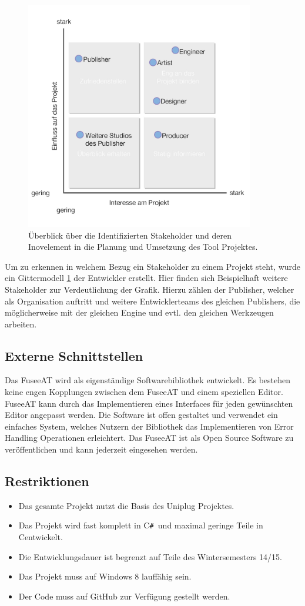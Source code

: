 \documentclass[pagesize, paper=a4, fontsize=12pt, titlepage=true, headings=small, headnosepline, abstractoff, liststotoc, nochapterprefix, plainheadsepline, twoside]{scrreprt}
\newcommand{\CSS}{C\texttt{\# }}
\newcommand{\CPP}{C\nolinebreak\hspace{-.05em}\raisebox{.4ex}{\tiny\bf +}\nolinebreak\hspace{-.10em}\raisebox{.4ex}{\tiny\bf +}}
\begin{document}
\begin{figure}[ht]
	\centering
	\includegraphics[width=10cm]{Bilder/Stakeholder_Diagramm.jpg}
	\caption{Überblick über die Identifizierten Stakeholder und deren Inovelement in die Planung und Umsetzung des Tool Projektes.}
	\label{StakeholderGrafik}
\end{figure}
Um zu erkennen in welchem Bezug ein Stakeholder zu einem Projekt steht, wurde ein Gittermodell \ref{StakeholderGrafik} der Entwickler erstellt. Hier finden sich Beispielhaft weitere Stakeholder zur Verdeutlichung der Grafik. Hierzu zählen der Publisher, welcher als Organisation auftritt und weitere Entwicklerteams des gleichen Publishers, die möglicherweise mit der gleichen Engine und evtl. den gleichen Werkzeugen arbeiten.

\subsection{Externe Schnittstellen}
Das FuseeAT wird als eigenständige Softwarebibliothek entwickelt. Es bestehen keine engen Kopplungen zwischen dem FuseeAT und einem speziellen Editor. FuseeAT kann durch das Implementieren eines Interfaces für jeden gewünschten Editor angepasst werden. Die Software ist offen gestaltet und verwendet ein einfaches System, welches Nutzern der Bibliothek das Implementieren von Error Handling Operationen erleichtert. Das FuseeAT ist als Open Source Software zu veröffentlichen und kann jederzeit eingesehen werden.

\subsection{Restriktionen}
\begin{itemize}
\item Das gesamte Projekt nutzt die Basis des Uniplug Projektes.
\item Das Projekt wird fast komplett in \CSS und maximal geringe Teile in \CPP entwickelt.
\item Die Entwicklungsdauer ist begrenzt auf Teile des Wintersemesters 14/15.
\item Das Projekt muss auf Windows 8 lauffähig sein.
\item Der Code muss auf GitHub zur Verfügung gestellt werden.
\end{itemize}
\end{document}
